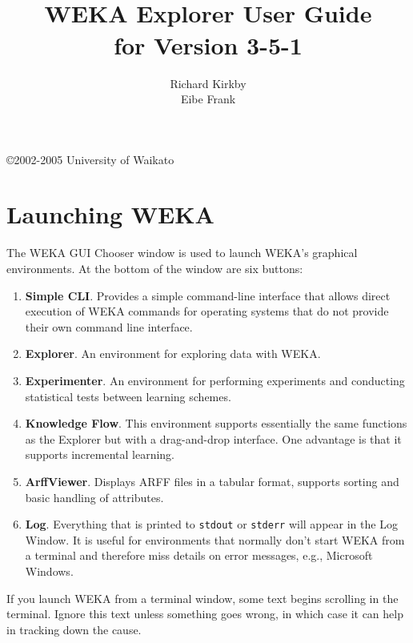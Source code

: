 \documentclass[a4paper]{article}
\title{\epsfig{file=coa-hor.eps,width=10cm}\vspace{3cm}\\WEKA Explorer User Guide\\for Version 3-5-1}
\author{Richard Kirkby\\Eibe Frank}
\begin{document}
\begin{titlepage}

\maketitle
\thispagestyle{empty}

\center
\vspace{8cm}

\copyright 2002-2005 University of Waikato

\end{titlepage}

\tableofcontents

\newpage

\section{Launching WEKA}

The WEKA GUI Chooser window is used to launch WEKA's graphical
environments. At the bottom of the window are six buttons:

\begin{enumerate}
\item \textbf{Simple CLI}.  Provides a simple command-line interface
that allows direct execution of WEKA commands for operating systems
that do not provide their own command line interface. 
\item \textbf{Explorer}.  An environment for exploring data with
WEKA. 
\item \textbf{Experimenter}.
An environment for performing experiments and conducting statistical tests
between learning schemes. 
\item \textbf{Knowledge Flow}.  This environment supports essentially
the same functions as the Explorer but with a drag-and-drop
interface. One advantage is that it supports incremental learning.
\item \textbf{ArffViewer}.  Displays ARFF files in a tabular format, 
supports sorting and basic handling of attributes.
\item \textbf{Log}.  Everything that is printed to \texttt{stdout} or 
\texttt{stderr} will appear in the Log Window. It is useful for environments 
that normally don't start WEKA from a terminal and therefore miss details 
on error messages, e.g., Microsoft Windows.
\end{enumerate}

If you launch WEKA from a terminal window, some text begins scrolling in the
terminal.  Ignore this text unless something goes wrong, in which case it can
help in tracking down the cause.
\end{document}
